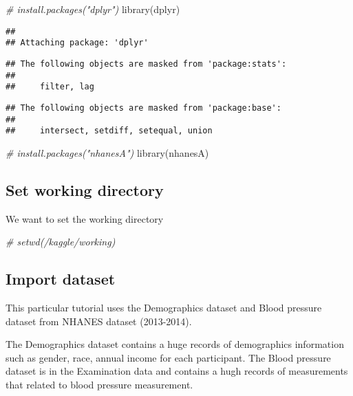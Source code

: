 \documentclass[
]{book}
\newenvironment{Shaded}{\begin{snugshade}}{\end{snugshade}}
\newcommand{\CommentTok}[1]{\textcolor[rgb]{0.56,0.35,0.01}{\textit{#1}}}
\newcommand{\FunctionTok}[1]{\textcolor[rgb]{0.00,0.00,0.00}{#1}}
\newcommand{\NormalTok}[1]{#1}
\begin{document}
\begin{Shaded}
\begin{Highlighting}[]
\CommentTok{\# install.packages("dplyr")}
\FunctionTok{library}\NormalTok{(dplyr)}
\end{Highlighting}
\end{Shaded}

\begin{verbatim}
##
## Attaching package: 'dplyr'
\end{verbatim}

\begin{verbatim}
## The following objects are masked from 'package:stats':
##
##     filter, lag
\end{verbatim}

\begin{verbatim}
## The following objects are masked from 'package:base':
##
##     intersect, setdiff, setequal, union
\end{verbatim}

\begin{Shaded}
\begin{Highlighting}[]
\CommentTok{\# install.packages("nhanesA")}
\FunctionTok{library}\NormalTok{(nhanesA)}
\end{Highlighting}
\end{Shaded}

\hypertarget{set-working-directory}{%
\subsection{Set working directory}\label{set-working-directory}}

We want to set the working directory

\begin{Shaded}
\begin{Highlighting}[]
\CommentTok{\# setwd(\textquotesingle{}/kaggle/working\textquotesingle{})}
\end{Highlighting}
\end{Shaded}

\hypertarget{import-dataset}{%
\subsection{Import dataset}\label{import-dataset}}

This particular tutorial uses the Demographics dataset and Blood pressure dataset from NHANES dataset (2013-2014).

The Demographics dataset contains a huge records of demographics information such as gender, race, annual income for each participant. The Blood pressure dataset is in the Examination data and contains a hugh records of measurements that related to blood pressure measurement.
\end{document}
